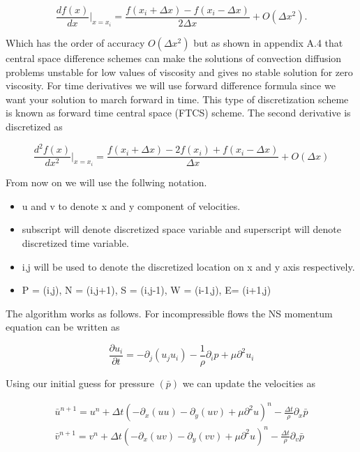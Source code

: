 \documentclass{article}		%
\begin{document}
\begin{equation}
\frac{df(x)}{dx} \bigg|_{x = x_i}  = \frac{f(x_{i} + \Delta x) - f(x_{i} - \Delta x) }{2\Delta x} + O(\Delta x^2).
\end{equation} 

Which has the order of accuracy $O(\Delta x^2)$ but as shown in appendix A.4 that central space difference schemes can make the solutions of convection diffusion problems unstable for low values of viscosity and gives no stable solution for zero viscosity. For time derivatives we will use forward difference formula since we want your solution to march forward in time. This type of discretization scheme is known as forward time central space (FTCS) scheme. The second derivative is discretized as 

\begin{equation}
\frac{d^2f(x)}{dx^2} \bigg|_{x = x_i}  = \frac{f(x_{i} + \Delta x) -2 f(x_i) + f(x_{i} - \Delta x) }{\Delta x} + O(\Delta x)
\end{equation}

From now on we will use the follwing notation.

\begin{itemize}
	\item u and v to denote x and y component of velocities.
	\item subscript will denote discretized space variable and superscript will denote discretized time variable. 
	\item i,j will be used to denote the discretized location on x and y axis respectively. 
	\item P = (i,j), N = (i,j+1), S = (i,j-1), W = (i-1,j), E= (i+1,j)  
\end{itemize}

 The algorithm works as follows. For incompressible flows the NS momentum equation can be written as 

$$
\frac{\partial  u_i }{\partial t} = -  \partial_j (u_j u_i) - \frac{1}{\rho} \partial_ip  + \mu \partial^2 u_i 
$$	

 Using our initial guess for pressure $(\bar{p})$ we can update the velocities as 

\begin{eqnarray}
\bar{u}^{n+1} = u^{n} + \Delta t \left( - \partial_x (uu) - \partial_y (uv) + \mu \partial^2 u \right)^n -  \frac{\Delta t}{\rho} \partial_x \bar{p} \\
\bar{v}^{n+1} = v^{n} + \Delta t \left( - \partial_x (uv) - \partial_y (vv) + \mu \partial^2 u \right)^n -  \frac{\Delta t}{\rho} \partial_v \bar{p} 
\end{eqnarray}
\end{document}
